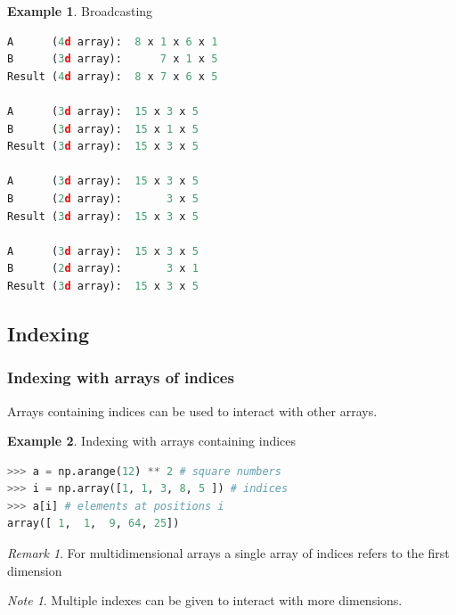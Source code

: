 \documentclass{article}
\theoremstyle{definition}
\newtheorem{ex}{Example}[subsection]
\theoremstyle{remark}
\newtheorem*{rem}{Remark}
\newtheorem*{nb}{Note}
\begin{document}
\begin{ex}Broadcasting
\begin{lstlisting}[language=Python]
A      (4d array):  8 x 1 x 6 x 1
B      (3d array):      7 x 1 x 5
Result (4d array):  8 x 7 x 6 x 5

A      (3d array):  15 x 3 x 5
B      (3d array):  15 x 1 x 5
Result (3d array):  15 x 3 x 5

A      (3d array):  15 x 3 x 5
B      (2d array):       3 x 5
Result (3d array):  15 x 3 x 5

A      (3d array):  15 x 3 x 5
B      (2d array):       3 x 1
Result (3d array):  15 x 3 x 5
\end{lstlisting}
\end{ex}


\break


\subsection{Indexing}

\subsubsection{Indexing with arrays of indices}

Arrays containing indices can be used to interact with other arrays.

\begin{ex}Indexing with arrays containing indices
\begin{lstlisting}[language=Python]
>>> a = np.arange(12) ** 2 # square numbers
>>> i = np.array([1, 1, 3, 8, 5 ]) # indices
>>> a[i] # elements at positions i
array([ 1,  1,  9, 64, 25])
\end{lstlisting}
\end{ex}

\begin{rem}
For multidimensional arrays a single array of indices refers to the first dimension
\end{rem}

\begin{nb}
Multiple indexes can be given to interact with more dimensions.
\end{nb}
\end{document}

